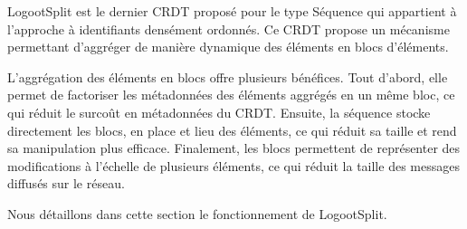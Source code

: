 \label{sec:logootsplit}

LogootSplit \cite{2013-logootsplit} est le dernier \ac{CRDT} proposé pour le type Séquence qui appartient à l'approche à identifiants densément ordonnés.
Ce \ac{CRDT} propose un mécanisme permettant d'aggréger de manière dynamique des éléments en blocs d'éléments.

L'aggrégation des éléments en blocs offre plusieurs bénéfices.
Tout d'abord, elle permet de factoriser les métadonnées des éléments aggrégés en un même bloc, ce qui réduit le surcoût en métadonnées du \ac{CRDT}.
Ensuite, la séquence stocke directement les blocs, en place et lieu des éléments, ce qui réduit sa taille et rend sa manipulation plus efficace.
Finalement, les blocs permettent de représenter des modifications à l'échelle de plusieurs éléments, ce qui réduit la taille des messages diffusés sur le réseau.

Nous détaillons dans cette section le fonctionnement de LogootSplit.
